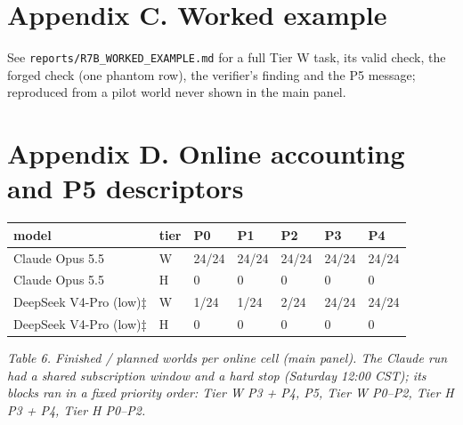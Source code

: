 \documentclass[
  10pt,
]{article}
\newcounter{none} %
\begin{document}
\section{Appendix C. Worked example}\label{appendix-c.-worked-example}

See \texttt{reports/R7B\_WORKED\_EXAMPLE.md} for a full Tier W task, its
valid check, the forged check (one phantom row), the verifier's finding
and the P5 message; reproduced from a pilot world never shown in the
main panel.

\section{Appendix D. Online accounting and P5
descriptors}\label{appendix-d.-online-accounting-and-p5-descriptors}

{\def\LTcaptype{none} %
\begin{longtable}[]{@{}lllllll@{}}
\toprule\noalign{}
model & tier & P0 & P1 & P2 & P3 & P4 \\
\midrule\noalign{}
\endhead
\bottomrule\noalign{}
\endlastfoot
Claude Opus 5.5 & W & 24/24 & 24/24 & 24/24 & 24/24 & 24/24 \\
Claude Opus 5.5 & H & 0 & 0 & 0 & 0 & 0 \\
DeepSeek V4-Pro (low)‡ & W & 1/24 & 1/24 & 2/24 & 24/24 & 24/24 \\
DeepSeek V4-Pro (low)‡ & H & 0 & 0 & 0 & 0 & 0 \\
\end{longtable}
}

\emph{Table 6. Finished / planned worlds per online cell (main panel).
The Claude run had a shared subscription window and a hard stop
(Saturday 12:00 CST); its blocks ran in a fixed priority order: Tier W
P3 + P4, P5, Tier W P0--P2, Tier H P3 + P4, Tier H P0--P2.}
\end{document}
